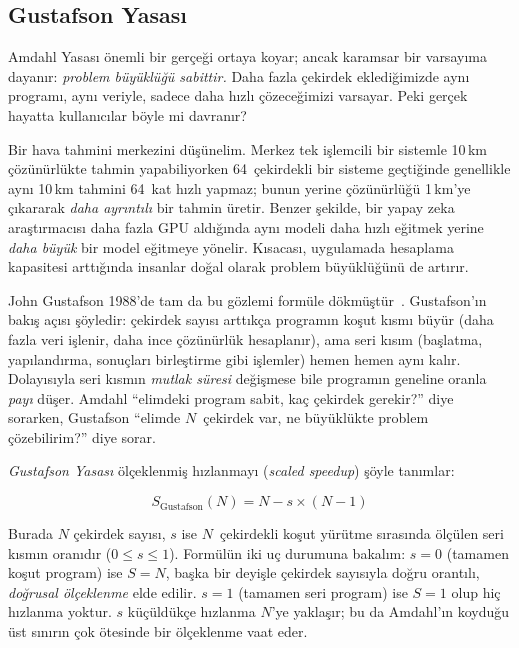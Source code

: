 \subsection{Gustafson Yasası}
\label{subsec:gustafson}

Amdahl Yasası önemli bir gerçeği ortaya koyar; ancak karamsar bir varsayıma dayanır: \emph{problem büyüklüğü sabittir.} Daha fazla çekirdek eklediğimizde aynı programı, aynı veriyle, sadece daha hızlı çözeceğimizi varsayar. Peki gerçek hayatta kullanıcılar böyle mi davranır?

Bir hava tahmini merkezini düşünelim. Merkez tek işlemcili bir sistemle 10\,km çözünürlükte tahmin yapabiliyorken 64~çekirdekli bir sisteme geçtiğinde genellikle aynı 10\,km tahmini 64~kat hızlı yapmaz; bunun yerine çözünürlüğü 1\,km'ye çıkararak \emph{daha ayrıntılı} bir tahmin üretir. Benzer şekilde, bir yapay zeka araştırmacısı daha fazla GPU aldığında aynı modeli daha hızlı eğitmek yerine \emph{daha büyük} bir model eğitmeye yönelir. Kısacası, uygulamada hesaplama kapasitesi arttığında insanlar doğal olarak problem büyüklüğünü de artırır.

John Gustafson 1988'de tam da bu gözlemi formüle dökmüştür~\cite{gustafson1988}. Gustafson'ın bakış açısı şöyledir: çekirdek sayısı arttıkça programın koşut kısmı büyür (daha fazla veri işlenir, daha ince çözünürlük hesaplanır), ama seri kısım (başlatma, yapılandırma, sonuçları birleştirme gibi işlemler) hemen hemen aynı kalır. Dolayısıyla seri kısmın \emph{mutlak süresi} değişmese bile programın geneline oranla \emph{payı} düşer. Amdahl ``elimdeki program sabit, kaç çekirdek gerekir?'' diye sorarken, Gustafson ``elimde $N$~çekirdek var, ne büyüklükte problem çözebilirim?'' diye sorar.

\emph{Gustafson Yasası} ölçeklenmiş hızlanmayı (\emph{scaled speedup}) şöyle tanımlar:

\begin{equation}
S_{\text{Gustafson}}(N) = N - s \times (N - 1)
\label{eq:gustafson}
\end{equation}

\noindent Burada $N$ çekirdek sayısı, $s$ ise $N$~çekirdekli koşut yürütme sırasında ölçülen seri kısmın oranıdır ($0 \le s \le 1$). Formülün iki uç durumuna bakalım: $s = 0$ (tamamen koşut program) ise $S = N$, başka bir deyişle çekirdek sayısıyla doğru orantılı, \emph{doğrusal ölçeklenme} elde edilir. $s = 1$ (tamamen seri program) ise $S = 1$ olup hiç hızlanma yoktur. $s$ küçüldükçe hızlanma $N$'ye yaklaşır; bu da Amdahl'ın koyduğu üst sınırın çok ötesinde bir ölçeklenme vaat eder.

